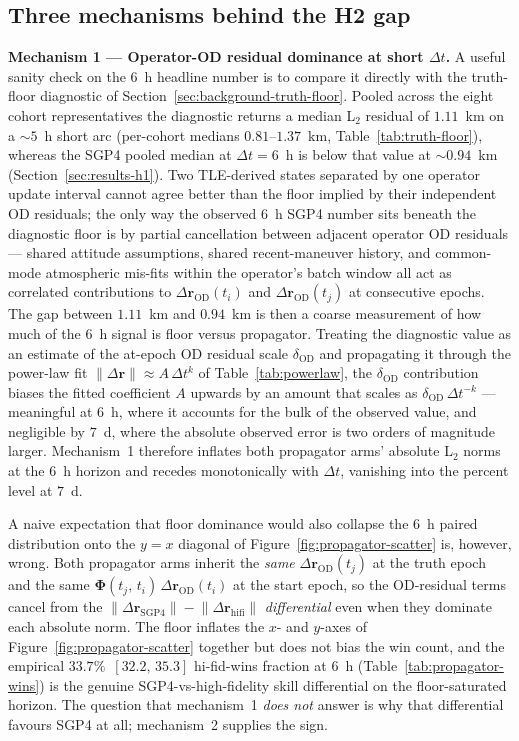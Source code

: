 \documentclass[10pt, letterpaper]{article}
\begin{document}
\subsection{Three mechanisms behind the H2 gap}
\label{sec:discussion-h2-mechanisms}

\textbf{Mechanism 1 --- Operator-OD residual dominance at short
$\Delta t$.} A useful sanity check on the $6$~h headline number is to
compare it directly with the truth-floor diagnostic of
Section~\ref{sec:background-truth-floor}. Pooled across the eight
cohort representatives the diagnostic returns a median L$_{2}$
residual of $1.11$~km on a $\sim 5$~h short arc (per-cohort medians
$0.81$--$1.37$~km, Table~\ref{tab:truth-floor}), whereas the SGP4
pooled median at $\Delta t = 6$~h is below that value at $\sim 0.94$~km
(Section~\ref{sec:results-h1}). Two TLE-derived states separated by
one operator update interval cannot agree better than the floor
implied by their independent OD residuals; the only way the observed
$6$~h SGP4 number sits beneath the diagnostic floor is by partial
cancellation between adjacent operator OD residuals --- shared attitude
assumptions, shared recent-maneuver history, and common-mode
atmospheric mis-fits within the operator's batch window all act as
correlated contributions to $\Delta\mathbf{r}_{\mathrm{OD}}(t_{i})$
and $\Delta\mathbf{r}_{\mathrm{OD}}(t_{j})$ at consecutive epochs.
The gap between $1.11$~km and $0.94$~km is then a coarse measurement
of how much of the $6$~h signal is floor versus propagator. Treating
the diagnostic value as an estimate of the at-epoch OD residual
scale $\delta_{\mathrm{OD}}$ and propagating it through the
power-law fit $\lVert\Delta\mathbf{r}\rVert \approx A\,\Delta t^{k}$
of Table~\ref{tab:powerlaw}, the $\delta_{\mathrm{OD}}$ contribution
biases the fitted coefficient $A$ upwards by an amount that scales
as $\delta_{\mathrm{OD}}\,\Delta t^{-k}$ --- meaningful at $6$~h,
where it accounts for the bulk of the observed value, and negligible
by $7$~d, where the absolute observed error is two orders of
magnitude larger. Mechanism~1 therefore inflates both propagator
arms' absolute L$_{2}$ norms at the $6$~h horizon and recedes
monotonically with $\Delta t$, vanishing into the percent level at
$7$~d.

A naive expectation that floor dominance would also collapse the
$6$~h paired distribution onto the $y = x$ diagonal of
Figure~\ref{fig:propagator-scatter} is, however, wrong. Both
propagator arms inherit the \emph{same} $\Delta\mathbf{r}_{\mathrm{OD}}(t_{j})$
at the truth epoch and the same
$\boldsymbol{\Phi}(t_{j},\,t_{i})\,\Delta\mathbf{r}_{\mathrm{OD}}(t_{i})$
at the start epoch, so the OD-residual terms cancel from the
$\lVert\Delta\mathbf{r}_{\mathrm{SGP4}}\rVert -
\lVert\Delta\mathbf{r}_{\mathrm{hifi}}\rVert$ \emph{differential}
even when they dominate each absolute norm. The floor inflates the
$x$- and $y$-axes of Figure~\ref{fig:propagator-scatter} together
but does not bias the win count, and the empirical
$33.7\%$~$[32.2,\,35.3]$ hi-fid-wins fraction at $6$~h
(Table~\ref{tab:propagator-wins}) is the genuine
SGP4-vs-high-fidelity skill differential on the floor-saturated
horizon. The question that mechanism~1 \emph{does not} answer is
why that differential favours SGP4 at all; mechanism~2 supplies
the sign.
\end{document}
